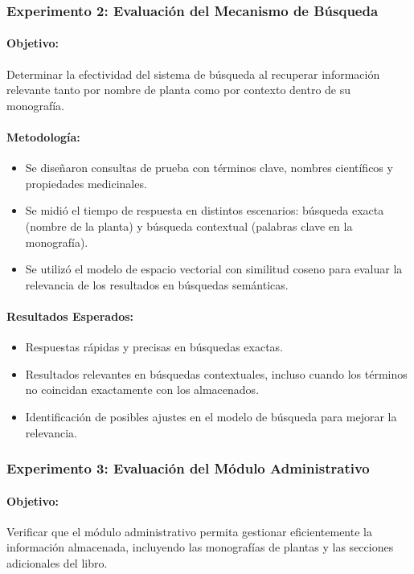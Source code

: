 \subsubsection*{Experimento 2: Evaluación del Mecanismo de Búsqueda}
\paragraph{Objetivo:}
Determinar la efectividad del sistema de búsqueda al recuperar información relevante tanto por nombre de planta 
como por contexto dentro de su monografía.
\paragraph{Metodología:}
\begin{itemize}
    \item Se diseñaron consultas de prueba con términos clave, nombres científicos y propiedades medicinales.
    \item Se midió el tiempo de respuesta en distintos escenarios: búsqueda exacta (nombre de la planta) y búsqueda contextual (palabras clave en la monografía).
    \item Se utilizó el modelo de espacio vectorial con similitud coseno para evaluar la relevancia de los resultados en búsquedas semánticas.
\end{itemize}
\paragraph{Resultados Esperados:}
\begin{itemize}
    \item Respuestas rápidas y precisas en búsquedas exactas.
    \item Resultados relevantes en búsquedas contextuales, incluso cuando los términos no coincidan exactamente con los almacenados.
    \item Identificación de posibles ajustes en el modelo de búsqueda para mejorar la relevancia.
\end{itemize}


\subsubsection*{Experimento 3: Evaluación del Módulo Administrativo}
\paragraph{Objetivo:}
Verificar que el módulo administrativo permita gestionar eficientemente la información almacenada, incluyendo las monografías de plantas y las secciones adicionales del libro.
